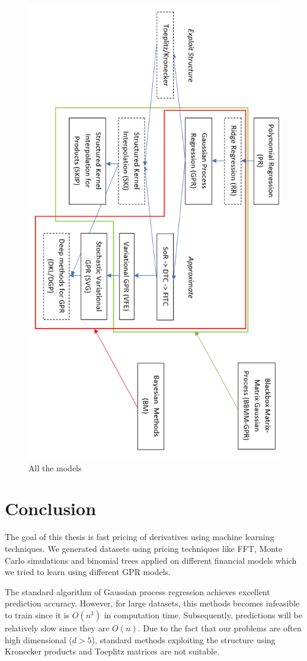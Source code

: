 \documentclass[12pt,a4paper,oneside]{book}
\begin{document}
\newpage

\begin{figure}[!htb]
     \centering
     \includegraphics[width=0.8\linewidth]{scheme_thesis}
     \caption{All the models}\label{fig:summary}
\end{figure}

\section{Conclusion}

The goal of this thesis is fast pricing of derivatives using machine learning techniques. We generated datasets using pricing techniques like FFT, Monte Carlo simulations and binomial trees applied on different financial models which we tried to learn using different GPR models.

The standard algorithm of Gaussian process regression achieves excellent prediction accuracy. However, for large datasets, this methods becomes infeasible to train since it is $O(n^3)$ in computation time. Subsequently, predictions will be relatively slow since they are $O(n)$. Due to the fact that our problems are often high dimensional ($d >5$), standard methods exploiting the structure using Kronecker products and Toeplitz matrices are not suitable. 
\end{document}
